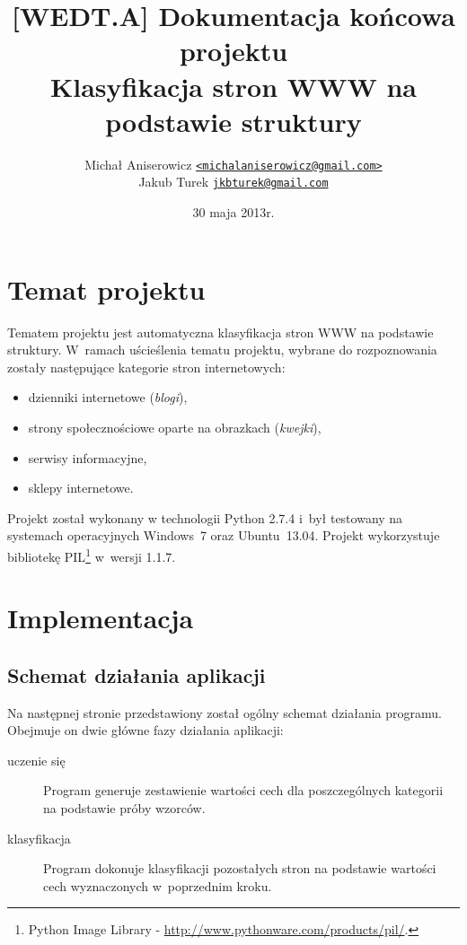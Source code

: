 \documentclass[a4paper,11pt]{article}
\author{Michał Aniserowicz \href{mailto:michalaniserowicz@gmail.com}{{\small \nolinkurl{<michalaniserowicz@gmail.com>}}} \\ Jakub Turek \href{mailto:jkbturek@gmail.com}{{\small \nolinkurl{jkbturek@gmail.com}}}}
\title{{\Large [WEDT.A] Dokumentacja końcowa projektu} \\ Klasyfikacja stron WWW na podstawie struktury}
\date{30 maja 2013r.}
\begin{document}
\maketitle

\section{Temat projektu}

Tematem projektu jest automatyczna klasyfikacja stron WWW na podstawie struktury. W~ramach uścieślenia tematu projektu, wybrane do rozpoznowania zostały następujące kategorie stron internetowych:

\begin{itemize}
 \item dzienniki internetowe (\emph{blogi}),
 \item strony społecznościowe oparte na obrazkach (\emph{kwejki}),
 \item serwisy informacyjne,
 \item sklepy internetowe.
\end{itemize}

Projekt został wykonany w technologii Python 2.7.4 i~był testowany na systemach operacyjnych Windows~7 oraz Ubuntu~13.04. Projekt wykorzystuje bibliotekę PIL\footnote{Python Image Library - \href{http://www.pythonware.com/products/pil/}{http://www.pythonware.com/products/pil/}.} w~wersji 1.1.7.

\section{Implementacja}

\subsection{Schemat działania aplikacji}

Na następnej stronie przedstawiony został ogólny schemat działania programu. Obejmuje on dwie główne fazy działania aplikacji:

\begin{description}
    \item[uczenie się] Program generuje zestawienie wartości cech dla poszczególnych kategorii na podstawie próby wzorców.
    \item[klasyfikacja] Program dokonuje klasyfikacji pozostałych stron na podstawie wartości cech wyznaczonych w~poprzednim kroku.
\end{description}
\end{document}
